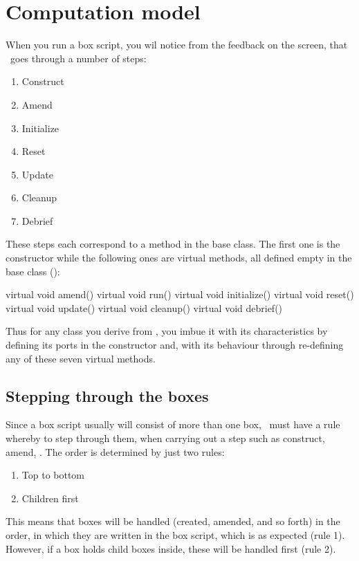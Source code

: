 \section{Computation model}

When you run a box script, you wil notice from the feedback on the screen, that \US\ goes through a number of steps:
\begin{enumerate}
\item Construct
\item Amend
\item Initialize
\item Reset
\item Update
\item Cleanup
\item Debrief
\end{enumerate}

These steps each correspond to a method in the  base class. The first one is the constructor while the following ones are virtual methods, all defined empty in the  base class ():

\begin{cpp}
virtual void amend() {}
virtual void run() {}
virtual void initialize() {}
virtual void reset() {}
virtual void update() {}
virtual void cleanup() {}
virtual void debrief() {}
\end{cpp}

Thus for any class you derive from , you imbue it with its characteristics by defining its ports in the constructor and, with its behaviour through re-defining any of these seven virtual methods.

\subsection{Stepping through the boxes}
Since a box script usually will consist of more than one box, \US\ must have a rule whereby to step through them, when carrying out a step such as construct, amend, \etc. The order is determined by just two rules:

\begin{enumerate}
\item Top to bottom
\item Children first
\end{enumerate}

This means that boxes will be handled (created, amended, and so forth) in the order, in which they are written in the box script, which is as expected (rule 1). However, if a box holds child boxes inside, these will be handled first (rule 2). 


